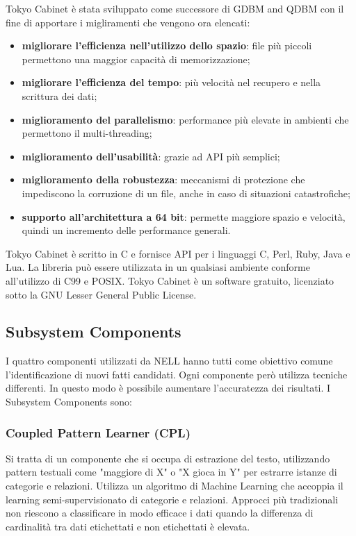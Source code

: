 
\noindent Tokyo Cabinet è stata sviluppato come successore di GDBM and QDBM con il fine di apportare i migliramenti che vengono ora elencati:
\begin{itemize}
	\item \textbf{migliorare l'efficienza nell'utilizzo dello spazio}: file più piccoli permettono una maggior capacità di memorizzazione;
	\item \textbf{migliorare l'efficienza del tempo}: più velocità nel recupero e nella scrittura dei dati;
	\item \textbf{miglioramento del parallelismo}: performance più elevate in ambienti che permettono il multi-threading;
	\item \textbf{miglioramento dell'usabilità}: grazie ad API più semplici;
	\item \textbf{miglioramento della robustezza}: meccanismi di protezione che impediscono la corruzione di un file, anche in caso di situazioni catastrofiche;
	\item \textbf{supporto all'architettura a 64 bit}: permette maggiore spazio e velocità, quindi un incremento delle performance generali.
\end{itemize}

\noindent Tokyo Cabinet è scritto in C e fornisce API per i linguaggi C, Perl, Ruby, Java e Lua.
La libreria può essere utilizzata in un qualsiasi ambiente conforme all'utilizzo di C99 e POSIX. Tokyo Cabinet è un software gratuito, licenziato sotto la GNU Lesser General Public License\cite{TokyoCab61:online}.
\subsection{Subsystem Components}
I quattro componenti utilizzati da NELL hanno tutti come obiettivo comune l'identificazione di nuovi fatti candidati. Ogni componente però utilizza tecniche differenti. In questo modo è possibile aumentare l'accuratezza dei risultati. I Subsystem Components sono:
\subsubsection{Coupled Pattern Learner (CPL)}
Si tratta di un componente che si occupa di estrazione del testo, utilizzando pattern testuali come "maggiore di X" o "X gioca in Y" per estrarre istanze di categorie e relazioni. Utilizza un algoritmo di Machine Learning che accoppia il learning semi-supervisionato di categorie e relazioni. Approcci più tradizionali non riescono a classificare in modo efficace i dati quando la differenza di cardinalità tra dati etichettati e non etichettati è elevata.

